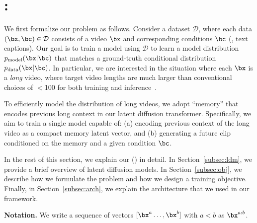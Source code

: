 
\section{\sname: \lname}
\label{sec:method}
We first formalize our problem as follows. Consider a dataset $\mathcal{D}$, where each data $(\bx, \bc) \in \mathcal{D}$ consists of a video $\bx$ and corresponding conditions $\bc$ (\eg, text captions). Our goal is to train a model using $\mathcal{D}$ to learn a model distribution $p_{\text{model}}(\bx | \bc)$ that matches a ground-truth conditional distribution $p_{\text{data}} (\bx | \bc)$. In particular, we are interested in the situation where each $\bx$ is a \emph{long} video, where target video lengths are much larger than conventional choices of $<$100 for both training and inference~\citep{he2022lvdm}.

To efficiently model the distribution of long videos, we adopt ``memory'' that encodes previous long context in our latent diffusion transformer. Specifically, we aim to train a single model capable of: (a) encoding previous context of the long video as a compact memory latent vector, and (b) generating a future clip conditioned on the memory and a given condition $\bc$. 

In the rest of this section, we explain our \lname (\sname) in detail. In Section~\ref{subsec:ldm}, we provide a brief overview of latent diffusion models. In Section~\ref{subsec:obj}, we describe how we formulate the problem and how we design a training objective. Finally, in Section~\ref{subsec:arch}, we explain the architecture that we used in our framework. %

\textbf{Notation.}
We write a sequence of vectors $[\bx^{a} \ldots, \bx^{b}]$ with $a<b$ as $\bx^{a:b}$. 


